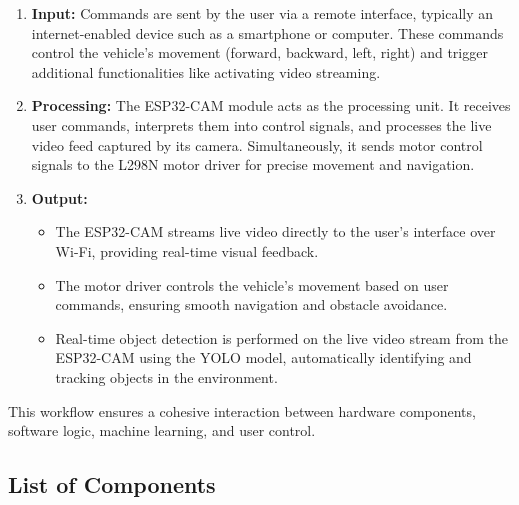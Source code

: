 \documentclass[12pt,a4paper]{report}
\begin{document}
\begin{enumerate}
    \item \textbf{Input:} Commands are sent by the user via a remote interface, typically an internet-enabled device such as a smartphone or computer. These commands control the vehicle's movement (forward, backward, left, right) and trigger additional functionalities like activating video streaming.
    
    \item \textbf{Processing:} The ESP32-CAM module acts as the processing unit. It receives user commands, interprets them into control signals, and processes the live video feed captured by its camera. Simultaneously, it sends motor control signals to the L298N motor driver for precise movement and navigation.
    
\item \textbf{Output:} 
	\begin{itemize}
    \item The ESP32-CAM streams live video directly to the user's interface over Wi-Fi, providing real-time visual feedback.
    \item The motor driver controls the vehicle's movement based on user commands, ensuring smooth navigation and obstacle avoidance.
    \item Real-time object detection is performed on the live video stream from the ESP32-CAM using the YOLO model, automatically identifying and tracking objects in the environment.
    \end{itemize}
\end{enumerate}

This workflow ensures a cohesive interaction between hardware components, software logic, machine learning, and user control.












\subsection{List of Components}
\end{document}
